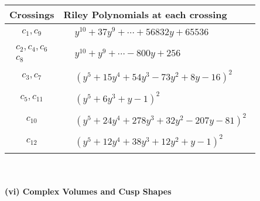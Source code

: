 \documentclass[1p]{elsarticle_modified}
\theoremstyle{definition}
\begin{document}
\begin{tabular}{m{50pt}|m{274pt}}
Crossings & \hspace{64pt}Riley Polynomials at each crossing \\
\hline $$\begin{aligned}c_{1},c_{9}\end{aligned}$$&$\begin{aligned}
&y^{10}+37 y^9+\cdots+56832 y+65536
\end{aligned}$\\
\hline $$\begin{aligned}c_{2},c_{4},c_{6}\\c_{8}\end{aligned}$$&$\begin{aligned}
&y^{10}+y^9+\cdots-800 y+256
\end{aligned}$\\
\hline $$\begin{aligned}c_{3},c_{7}\end{aligned}$$&$\begin{aligned}
&(y^5+15 y^4+54 y^3-73 y^2+8 y-16)^2
\end{aligned}$\\
\hline $$\begin{aligned}c_{5},c_{11}\end{aligned}$$&$\begin{aligned}
&(y^5+6 y^3+y-1)^2
\end{aligned}$\\
\hline $$\begin{aligned}c_{10}\end{aligned}$$&$\begin{aligned}
&(y^5+24 y^4+278 y^3+32 y^2-207 y-81)^2
\end{aligned}$\\
\hline $$\begin{aligned}c_{12}\end{aligned}$$&$\begin{aligned}
&(y^5+12 y^4+38 y^3+12 y^2+y-1)^2
\end{aligned}$\\
\hline
\end{tabular}\\~\\
\newpage\flushleft \textbf{(vi) Complex Volumes and Cusp Shapes}
\end{document}
